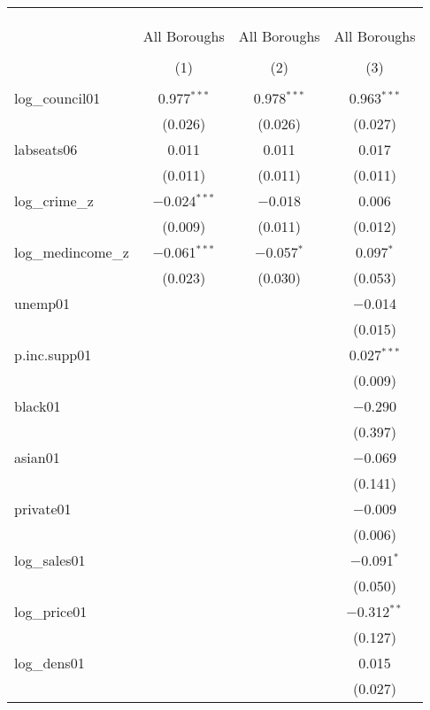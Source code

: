 
\begin{table}[!htbp] \centering 
  \caption{} 
  \label{} 
\begin{tabular}{@{\extracolsep{5pt}}lccc} 
\\[-1.8ex]\hline \\[-1.8ex] 
\\[-1.8ex] & \multicolumn{3}{c}{} \\ 
 & All Boroughs & All Boroughs & All Boroughs \\ 
\\[-1.8ex] & (1) & (2) & (3)\\ 
\hline \\[-1.8ex] 
 log\_council01 & 0.977$^{***}$ & 0.978$^{***}$ & 0.963$^{***}$ \\ 
  & (0.026) & (0.026) & (0.027) \\ 
  labseats06 & 0.011 & 0.011 & 0.017 \\ 
  & (0.011) & (0.011) & (0.011) \\ 
  log\_crime\_z & $-$0.024$^{***}$ & $-$0.018 & 0.006 \\ 
  & (0.009) & (0.011) & (0.012) \\ 
  log\_medincome\_z & $-$0.061$^{***}$ & $-$0.057$^{*}$ & 0.097$^{*}$ \\ 
  & (0.023) & (0.030) & (0.053) \\ 
  unemp01 &  &  & $-$0.014 \\ 
  &  &  & (0.015) \\ 
  p.inc.supp01 &  &  & 0.027$^{***}$ \\ 
  &  &  & (0.009) \\ 
  black01 &  &  & $-$0.290 \\ 
  &  &  & (0.397) \\ 
  asian01 &  &  & $-$0.069 \\ 
  &  &  & (0.141) \\ 
  private01 &  &  & $-$0.009 \\ 
  &  &  & (0.006) \\ 
  log\_sales01 &  &  & $-$0.091$^{*}$ \\ 
  &  &  & (0.050) \\ 
  log\_price01 &  &  & $-$0.312$^{**}$ \\ 
  &  &  & (0.127) \\ 
  log\_dens01 &  &  & 0.015 \\ 
  &  &  & (0.027) \\ 

\end{tabular}
\end{table}

